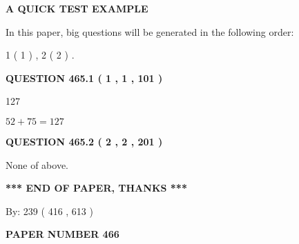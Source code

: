 \documentclass[12pt]{article}
\begin{document}
   
 \vspace{0.2in}
{\LARGE {\textbf{ A QUICK TEST EXAMPLE}}}
   
   
   
\vspace{0.2in}
   
In this paper, big questions will be generated in the following order: 
   
   
   1 ( 1 )
 ,
   2 ( 2 )
 .
  
\vspace{0.2in}
  
{\textbf{\Large{QUESTION
465.1 
 ( 1 , 1 , 101 )
}}}
  
  
 
 
\noindent{}

127
 
 
 
 
\noindent{}

$ %
52 +  %
75=   %
127$
 
 
  
\vspace{0.2in}
  
{\textbf{\Large{QUESTION
465.2 
 ( 2 , 2 , 201 )
}}}
  
  
 
 
\noindent{}
 
 
 None of above.
 
 
 
 
   
   
 \vspace{0.2in}
 
   
   
   
   
\vspace{1.0in} 
{\textbf{\large{ *** END OF PAPER, THANKS *** }}} 
   
   
\hspace{1.0in} By: 
 239 ( 416 ,  613 )
   
   
   
   
\newpage 
\setcounter{page}{ 
   466001 } 
   
   
   
   
 {\textbf{ \Large{ PAPER NUMBER  466  }}}
   
   
\vspace{0.2in}
   
\end{document}
